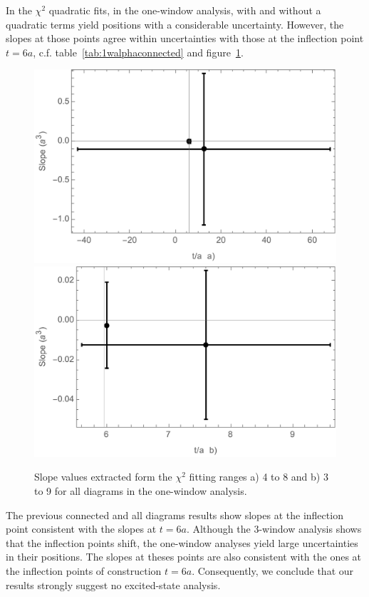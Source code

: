 In the $\chi^2$ quadratic fits, in the one-window analysis,  with and without a quadratic terms yield 
positions with a considerable uncertainty. However, the slopes at those points agree within uncertainties 
with those at the inflection point $t=6a$, c.f. table~\ref{tab:1walphaconnected} 
and figure~\ref{fig:1wshifinflec_all}.
\begin{figure}[H]
  \includegraphics[width=.49\linewidth]{figures/1wF4-8Chi.png}
  \includegraphics[width=.495\linewidth]{figures/1wF3-9Chi.png}
  \caption{Slope values extracted form the $\chi^2$ fitting ranges a) 4 to 8 and b) 3 to 9 for all diagrams
  in the one-window analysis.}
  \label{fig:1wshifinflec_all}
\end{figure}
The previous connected and all diagrams results show slopes at the inflection point consistent
with the slopes at $t=6a$. Although the 3-window analysis shows that the inflection 
points shift, the one-window analyses yield large uncertainties in their positions. The slopes at 
theses points are also consistent with the ones at the inflection points of construction $t=6a$. 
Consequently, we conclude that our results strongly suggest no excited-state analysis.